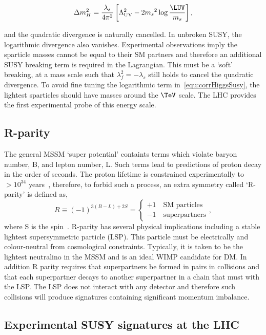 \begin{equation}
\label{equ:corrHiggsSusy}
\Delta m^2_H =  \frac{\lambda_s}{4\pi^2}\left[\Lambda^2_{\text{UV}} - 2 {m_s}^2\log\frac{\LUV}{m_s}\right],
\end{equation}

and the quadratic divergence is naturally cancelled. In unbroken SUSY, the logarithmic divergence also vanishes. 
Experimental observations imply the sparticle masses cannot be equal to their SM partners and
therefore an additional SUSY breaking term is required in the Lagrangian. This must be a `soft' breaking,
at a mass scale such that $\lambda_f^2 = -\lambda_s$ still holds to cancel the quadratic divergence.
To avoid fine tuning the logarithmic term in~\ref{equ:corrHiggsSusy}, the lightest sparticles should have 
masses around the $\TeV$ scale. The LHC provides the first experimental probe of this energy scale.

\subsection{R-parity}

The general MSSM `super potential' containts terms which violate baryon number, B, and lepton number, 
L. Such terms lead to predictions of proton decay in the order of seconds. 
The proton lifetime is constrained experimentally to $> 10^{34}$ years~\cite{protonDecay},
therefore, to forbid such a process, an extra symmetry called `R-parity' is defined as,
\begin{equation}
R \equiv (-1)^{3(B-L)+2S} = 
\begin{cases}
+ 1\quad \text{SM particles}\\
- 1\quad \text{superpartners}
\end{cases},
\end{equation}
where S is the spin~\cite{SUSYP}. R-parity has several physical implications including a stable lightest supersymmetric 
particle (LSP). This particle must be electrically and colour-neutral from cosmological constraints.
Typically, it is taken to be the lightest neutralino in the MSSM and is an ideal WIMP candidate for DM. 
In addition R parity requires that superpartners be
formed in pairs in collisions and that each superpartner decays to another superpartner
in a chain that must with the LSP. The LSP does not interact with any detector and therefore
such collisions will produce signatures containing significant momentum imbalance.

\subsection{Experimental SUSY signatures at the LHC}

